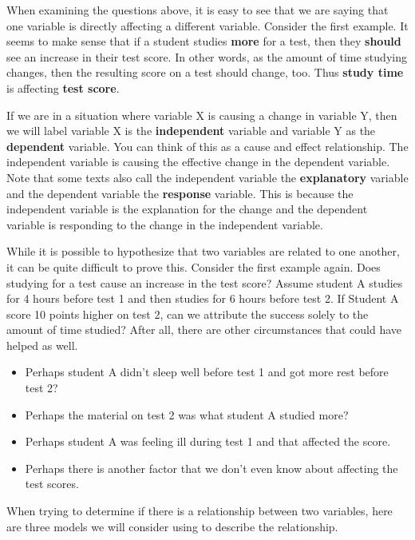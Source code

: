 \documentclass[
  letterpaper,
  DIV=11,
  numbers=noendperiod]{scrreprt}
\providecommand{\tightlist}{%
  \setlength{\itemsep}{0pt}\setlength{\parskip}{0pt}}\usepackage{longtable,booktabs,array}
\begin{document}
When examining the questions above, it is easy to see that we are saying
that one variable is directly affecting a different variable. Consider
the first example. It seems to make sense that if a student studies
\textbf{more} for a test, then they \textbf{should} see an increase in
their test score. In other words, as the amount of time studying
changes, then the resulting score on a test should change, too. Thus
\textbf{study time} is affecting \textbf{test score}.

If we are in a situation where variable X is causing a change in
variable Y, then we will label variable X is the \textbf{independent}
variable and variable Y as the \textbf{dependent} variable. You can
think of this as a cause and effect relationship. The independent
variable is causing the effective change in the dependent variable. Note
that some texts also call the independent variable the
\textbf{explanatory} variable and the dependent variable the
\textbf{response} variable. This is because the independent variable is
the explanation for the change and the dependent variable is responding
to the change in the independent variable.

While it is possible to hypothesize that two variables are related to
one another, it can be quite difficult to prove this. Consider the first
example again. Does studying for a test cause an increase in the test
score? Assume student A studies for 4 hours before test 1 and then
studies for 6 hours before test 2. If Student A score 10 points higher
on test 2, can we attribute the success solely to the amount of time
studied? After all, there are other circumstances that could have helped
as well.

\begin{itemize}
\tightlist
\item
  Perhaps student A didn't sleep well before test 1 and got more rest
  before test 2?
\item
  Perhaps the material on test 2 was what student A studied more?
\item
  Perhaps student A was feeling ill during test 1 and that affected the
  score.
\item
  Perhaps there is another factor that we don't even know about
  affecting the test scores.
\end{itemize}

When trying to determine if there is a relationship between two
variables, here are three models we will consider using to describe the
relationship.
\end{document}
